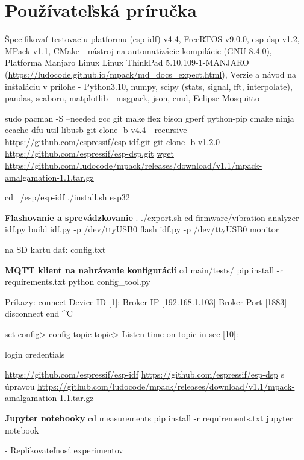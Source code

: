 \thispagestyle{empty}
\setcounter{figure}{0}
\chapter{Používateľská príručka}
\renewcommand*{\thepage}{C-\arabic{page}}
Špecifikovať testovaciu platformu
(esp-idf) v4.4, FreeRTOS v9.0.0, esp-dsp v1.2, MPack v1.1, CMake - nástroj na automatizácie kompilácie (GNU 8.4.0), Platforma Manjaro Linux
	Linux ThinkPad 5.10.109-1-MANJARO (\url{https://ludocode.github.io/mpack/md_docs_expect.html}), Verzie a návod na inštaláciu v prílohe
- Python3.10, numpy, scipy (stats, signal, fft, interpolate), pandas, seaborn, matplotlib
- msgpack, json, cmd,  Eclipse Mosquitto

sudo pacman -S --needed gcc git make flex bison gperf python-pip cmake ninja ccache dfu-util libusb
\url{git clone -b v4.4 --recursive https://github.com/espressif/esp-idf.git}
\url{git clone -b v1.2.0 https://github.com/espressif/esp-dsp.git}
\url{wget https://github.com/ludocode/mpack/releases/download/v1.1/mpack-amalgamation-1.1.tar.gz}


cd ~/esp/esp-idf
./install.sh esp32


\textbf{Flashovanie a sprevádzkovanie}
. ./export.sh
cd firmware/vibration-analyzer
idf.py build
idf.py -p /dev/ttyUSB0 flash
idf.py -p /dev/ttyUSB0 monitor

na SD kartu dať: config.txt


\textbf{MQTT klient na nahrávanie konfigurácií}
cd  main/tests/
pip install -r requirements.txt
python config\_tool.py

Príkazy:
	connect
		Device ID [1]:
      	Broker IP [192.168.1.103]
        Broker Port [1883]
	disconnect
	end
	^C

	set
		config>
	config
	topic
		topic>
		Listen time on topic in sec [10]:

	login
	credentials

\url{https://github.com/espressif/esp-idf}
\url{https://github.com/espressif/esp-dsp} s úpravou
\url{https://github.com/ludocode/mpack/releases/download/v1.1/mpack-amalgamation-1.1.tar.gz}

\textbf{Jupyter notebooky}
cd measurements
pip install -r requirements.txt
jupyter notebook

- Replikovateľnosť experimentov

